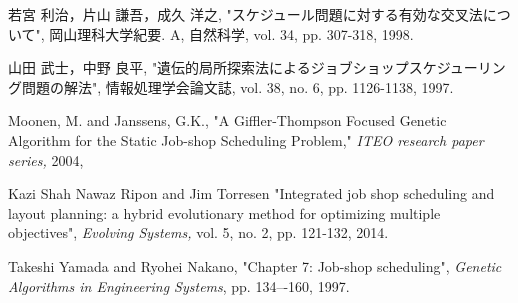 \documentclass{jsarticle}
\begin{document}
\begin{thebibliography}{9}
  若宮 利治，片山 謙吾，成久 洋之,
  "スケジュール問題に対する有効な交叉法について",
  岡山理科大学紀要. A, 自然科学,
  vol. 34, pp. 307-318, 1998.

  山田 武士，中野 良平,
  "遺伝的局所探索法によるジョブショップスケジューリング問題の解法",
  情報処理学会論文誌,
  vol. 38, no. 6, pp. 1126-1138, 1997.

  Moonen, M. and Janssens, G.K.,
  "A Giffler-Thompson Focused Genetic Algorithm for the Static Job-shop Scheduling Problem,"
  \textit{ITEO research paper series,}
  2004,

  Kazi Shah Nawaz Ripon and Jim Torresen
  "Integrated job shop scheduling and layout planning: a hybrid evolutionary method for optimizing multiple objectives",
  \textit{Evolving Systems,}
  vol. 5, no. 2, pp. 121-132, 2014.

  Takeshi Yamada and Ryohei Nakano,
  "Chapter 7: Job-shop scheduling",
  \textit{Genetic Algorithms in Engineering Systems},
  pp. 134–-160, 1997.

\end{thebibliography}
\end{document}
